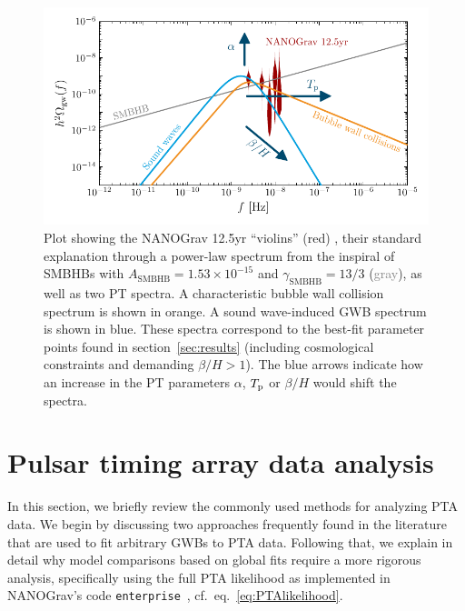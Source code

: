 \begin{figure}[t]
	\centering
	\includegraphics[width=\linewidth]{thesisplots/ptbbn/ptbbn_2}
	\caption{Plot showing the \ac{NANOGrav} 12.5yr ``violins'' (\textcolor{DESYdunkelrot}{red}) \cite{NANOGrav:2020bcs}, their standard 
		explanation through a power-law spectrum from the inspiral of \acp{SMBHB} with $A_\text{SMBHB} = 1.53 \times 10^{-15}$ and 
		$\gamma_\text{SMBHB} = 13/3$ (\textcolor{gray}{gray}), as well as two \ac{PT} spectra. A characteristic bubble wall collision spectrum is shown in \textcolor{DESYorange}{orange}. A sound wave-induced \ac{GWB} spectrum is shown in \textcolor{DESYcyan}{blue}. These spectra correspond to the best-fit parameter points found in section~\ref{sec:results} (including cosmological constraints and demanding $\beta/H > 1$). The blue arrows indicate how an increase in the \ac{PT} parameters $\alpha$, $T_{\text{p}}$ or $\beta/H$ would shift the spectra.}
	\label{fig:spectrainfo}
\end{figure}

\section{Pulsar timing array data analysis}
\label{sec:pta}

In this section, we briefly review the commonly used methods for analyzing \ac{PTA} data. We begin by discussing two approaches frequently found in the literature that are used to fit arbitrary \acp{GWB} to \ac{PTA} data. Following that, we explain in detail why   model comparisons based on global fits require a more rigorous analysis, specifically using the full \ac{PTA} likelihood as implemented in \ac{NANOGrav}’s code \texttt{enterprise}~\cite{enterprise, enterprise2}, cf.~eq.~\eqref{eq:PTAlikelihood}.

